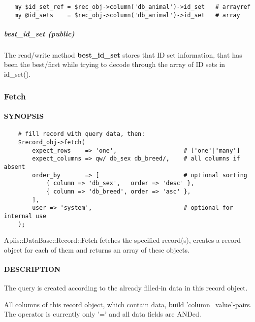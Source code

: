 \begin{verbatim}
   my $id_set_ref = $rec_obj->column('db_animal')->id_set   # arrayref
   my @id_sets    = $rec_obj->column('db_animal')->id_set   # array
\end{verbatim}
\subparagraph*{best\_id\_set (public)\label{Apiis::DataBase::Record::Column_--_package_for_DataBase_Record_columns_best_id_set_public_}}


The read/write method \textbf{best\_id\_set} stores that ID set information, that has
been the best/first while trying to decode through the array of ID sets in
id\_set().

\subsubsection{Fetch\label{Fetch}}




\paragraph*{SYNOPSIS\label{Fetch_SYNOPSIS}}
\begin{verbatim}
    # fill record with query data, then:
    $record_obj->fetch(
        expect_rows    => 'one',                   # ['one'|'many']
        expect_columns => qw/ db_sex db_breed/,    # all columns if absent
        order_by       => [                        # optional sorting
            { column => 'db_sex',   order => 'desc' },
            { column => 'db_breed', order => 'asc' },
        ],
        user => 'system',                          # optional for internal use
    );
\end{verbatim}


Apiis::DataBase::Record::Fetch fetches the specified record(s), creates a
record object for each of them and returns an array of these objects.

\paragraph*{DESCRIPTION\label{Fetch_DESCRIPTION}}


The query is created according to the already filled-in data in this record
object.



All columns of this record object, which contain data, build
'column=value'-pairs. The operator is currently only '=' and all data fields
are ANDed.



